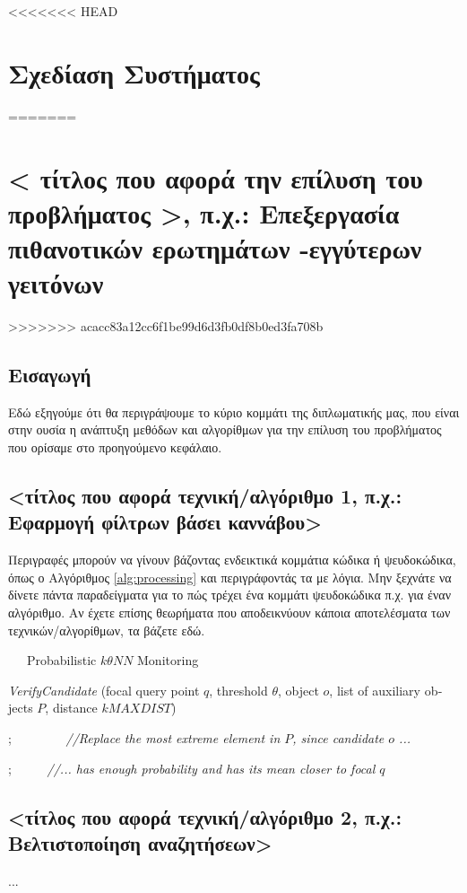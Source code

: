 <<<<<<< HEAD
\chapter{Σχεδίαση Συστήματος}
\label{chap4}
=======
\chapter{< τίτλος που αφορά την επίλυση του προβλήματος >, π.χ.: Επεξεργασία πιθανοτικών ερωτημάτων -εγγύτερων γειτόνων}
\label{chap5}
>>>>>>> acacc83a12cc6f1be99d6d3fb0df8b0ed3fa708b

\section{Εισαγωγή}

Εδώ εξηγούμε ότι θα περιγράψουμε το κύριο κομμάτι της διπλωματικής μας, που είναι στην ουσία η ανάπτυξη μεθόδων και αλγορίθμων για την επίλυση του προβλήματος που ορίσαμε στο προηγούμενο κεφάλαιο. 

\section{<τίτλος που αφορά τεχνική/αλγόριθμο 1, π.χ.: Εφαρμογή φίλτρων βάσει καννάβου>}

Περιγραφές μπορούν να γίνουν βάζοντας ενδεικτικά κομμάτια κώδικα ή ψευδοκώδικα, όπως ο Αλγόριθμος \ref{alg:processing} και περιγράφοντάς τα με λόγια. Μην ξεχνάτε να δίνετε πάντα παραδείγματα για το πώς τρέχει ένα κομμάτι ψευδοκώδικα π.χ. για έναν αλγόριθμο.
Αν έχετε επίσης θεωρήματα που αποδεικνύουν κάποια αποτελέσματα των τεχνικών/αλγορίθμων, τα βάζετε εδώ. 

\begin{otherlanguage}{english}
\begin{algorithm}
\caption{\ \ \ Probabilistic $k\theta NN$ Monitoring}
\begin{algorithmic}[1]
\begin{footnotesize}

 {\em VerifyCandidate} (focal query point $q$, threshold $\theta$, object $o$, list of auxiliary objects $P$, distance $kMAXDIST$) 


;   \ \ \ \ \ \ \ \ {\em //Replace the most extreme element in $P$, since candidate $o$ ... }

;  \ \ \ \ \ {\em //... has enough probability and has its mean closer to focal $q$ }

\ENDIF



\end{footnotesize}
\end{algorithmic}
\label{alg:processing}
\end{algorithm}
\end{otherlanguage}


\section{<τίτλος που αφορά τεχνική/αλγόριθμο 2, π.χ.: Βελτιστοποίηση αναζητήσεων>}

...


